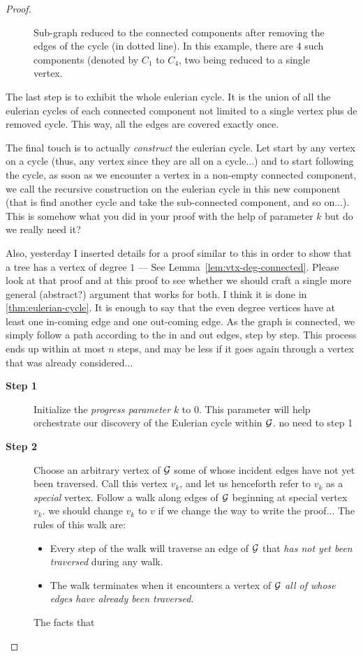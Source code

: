 \begin{proof}
\begin{figure}[hbt]
\begin{center}
       \caption{Sub-graph reduced to the connected components after removing the edges of the cycle
       (in dotted line).
       In this example, there are 4 such components (denoted by $C_1$ to $C_4$, two being reduced to a single vertex.}
  \label{fig:eulerianProof2}
\end{center}
\end{figure}
The last step is to exhibit the whole eulerian cycle.
It is the union of all the eulerian cycles of each connected component not limited to a single vertex
plus de removed cycle.
This way, all the edges are covered exactly once. 
\medskip

The final touch is to actually \textit{construct} the eulerian cycle. 
Let start by any vertex on a cycle (thus, any vertex since they are all on a cycle...)
and to start following the cycle, as soon as we encounter a vertex in a non-empty connected component, 
we call the recursive construction on the eulerian cycle in this new component
(that is find another cycle and take the sub-connected component, and so on...).
{\Denis This is somehow what you did in your proof with the help of parameter $k$ but do we really need it?}

{\Arny Also, yesterday I inserted details for a proof similar to this in order to show that a tree has
a vertex of degree $1$ --- See Lemma~\ref{lem:vtx-deg-connected}.  Please look at that proof and 
at this proof to see whether we should craft  a single more general (abstract?) argument 
that works for both.}
{\Denis I think it is done in \ref{thm:eulerian-cycle}.
It is enough to say that the even degree vertices have at least one in-coming edge and one out-coming edge.
As the graph is connected, we simply follow a path according to the in and out edges, step by step.
This process ends up within at most $n$ steps, and may be less if it goes again through a vertex that was already considered...}

\begin{description}
\item[{\bf Step 1}]
Initialize the {\it progress parameter} $k$ to $0$.  This parameter
will help orchestrate our discovery of the Eulerian cycle within $\mbox{$\cal G$}$.
{\Denis no need to step 1}

\item[{\bf Step 2}]
Choose an arbitrary vertex of $\mbox{$\cal G$}$ some of whose incident edges have not
yet been traversed.  Call this vertex $v_k$, and let us henceforth refer
to $v_k$ as a {\em special} vertex.  Follow a walk along edges of $\mbox{$\cal G$}$
beginning at special vertex $v_k$.  
{\Denis we should change $v_k$ to $v$ if we change the way to write the proof...}
The rules of this walk are:
\begin{itemize}
\item
Every step of the walk will traverse an edge of $\mbox{$\cal G$}$ that {\em has not yet been traversed} during any walk.
\item
The walk terminates when it encounters a vertex of $\mbox{$\cal G$}$ {\em all of
  whose edges have already been traversed}.
\end{itemize}
The facts that 


\end{description}
\end{proof}
